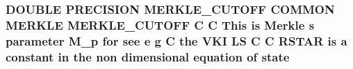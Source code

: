 \hypertarget{msa20_2home_2abonfi_2_c_f_d__codes_2_eul_f_s_83_82_83_2include_2merkle_8com_a0ca46ab387e5b2d25720de7e533a6180}{
\subsubsection[{state}]{\setlength{\rightskip}{0pt plus 5cm}D\-O\-U\-B\-L\-E P\-R\-E\-C\-I\-S\-I\-O\-N M\-E\-R\-K\-L\-E\-\_\-\-C\-U\-T\-O\-F\-F C\-O\-M\-M\-O\-N M\-E\-R\-K\-L\-E M\-E\-R\-K\-L\-E\-\_\-\-C\-U\-T\-O\-F\-F C C This is Merkle s {\bf parameter} M\-\_\-p for see e g C the V\-K\-I L\-S C C R\-S\-T\-A\-R is a constant in the non dimensional equation of state}}\label{msa20_2home_2abonfi_2_c_f_d__codes_2_eul_f_s_83_82_83_2include_2merkle_8com_a0ca46ab387e5b2d25720de7e533a6180}

